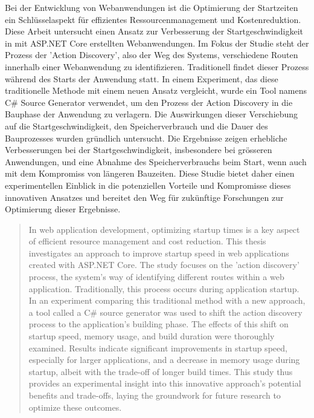 \begin{zusammenfassung}
Bei der Entwicklung von Webanwendungen ist die Optimierung der Startzeiten ein Schlüsselaspekt für effizientes Ressourcenmanagement und Kostenreduktion. Diese Arbeit untersucht einen Ansatz zur Verbesserung der Startgeschwindigkeit in mit ASP.NET Core erstellten Webanwendungen. Im Fokus der Studie steht der Prozess der 'Action Discovery', also der Weg des Systems, verschiedene Routen innerhalb einer Webanwendung zu identifizieren. Traditionell findet dieser Prozess während des Starts der Anwendung statt. In einem Experiment, das diese traditionelle Methode mit einem neuen Ansatz vergleicht, wurde ein Tool namens C\# Source Generator verwendet, um den Prozess der Action Discovery in die Bauphase der Anwendung zu verlagern. Die Auswirkungen dieser Verschiebung auf die Startgeschwindigkeit, den Speicherverbrauch und die Dauer des Bauprozesses wurden gründlich untersucht. Die Ergebnisse zeigen erhebliche Verbesserungen bei der Startgeschwindigkeit, insbesondere bei grösseren Anwendungen, und eine Abnahme des Speicherverbrauchs beim Start, wenn auch mit dem Kompromiss von längeren Bauzeiten. Diese Studie bietet daher einen experimentellen Einblick in die potenziellen Vorteile und Kompromisse dieses innovativen Ansatzes und bereitet den Weg für zukünftige Forschungen zur Optimierung dieser Ergebnisse.
\end{zusammenfassung}

\begin{abstract}
In web application development, optimizing startup times is a key aspect of efficient resource management and cost reduction. This thesis investigates an approach to improve startup speed in web applications created with ASP.NET Core. The study focuses on the 'action discovery' process, the system's way of identifying different routes within a web application. Traditionally, this process occurs during application startup. In an experiment comparing this traditional method with a new approach, a tool called a C\# source generator was used to shift the action discovery process to the application's building phase. The effects of this shift on startup speed, memory usage, and build duration were thoroughly examined. Results indicate significant improvements in startup speed, especially for larger applications, and a decrease in memory usage during startup, albeit with the trade-off of longer build times. This study thus provides an experimental insight into this innovative approach's potential benefits and trade-offs, laying the groundwork for future research to optimize these outcomes.
\end{abstract}